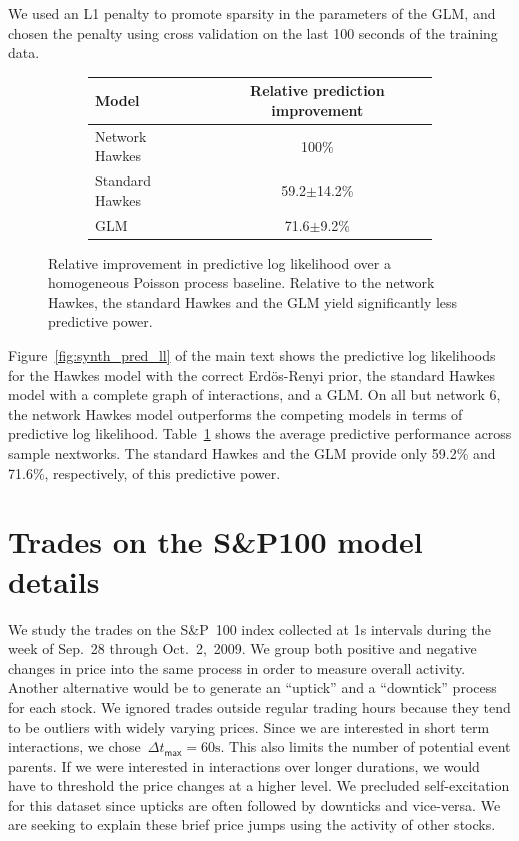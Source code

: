 We used an L1 penalty to promote sparsity in the parameters of the GLM, and chosen the penalty using cross validation on the last 100 seconds of the training data.

\begin{figure}[h!]
\begin{center}
\begin{subfigure}[T]{\linewidth}
\begin{center}
\begin{tabular}{|l|c|}
\hline
\textbf{Model} & \textbf{Relative prediction improvement} \\
\hline
Network Hawkes & 100\% \\
Standard Hawkes & 59.2$\pm$14.2\% \\
GLM & 71.6$\pm$9.2\%\\
\hline
\end{tabular}
\end{center}
\end{subfigure}
\end{center}
\caption{Relative improvement in predictive log likelihood over a homogeneous Poisson process baseline. Relative to the network Hawkes, the standard Hawkes and the GLM yield significantly less predictive power.}
\label{tab:rel_pred_ll}
\end{figure}
Figure~\ref{fig:synth_pred_ll} of the main text shows the predictive log likelihoods for the Hawkes model with the correct Erd\"os-Renyi prior, the standard Hawkes model with a complete graph of interactions, and a GLM. On all but network 6, the network Hawkes model outperforms the competing models in terms of predictive log likelihood. Table~\ref{tab:rel_pred_ll} shows the average predictive performance across sample nextworks. The standard Hawkes and the GLM provide only 59.2\% and 71.6\%, respectively, of this predictive power.

\section{Trades on the S\&P100 model details}
We study the trades on the S\&P~100 index collected at 1s intervals during the week of Sep.~28 through Oct.~2,~2009. We group both positive and negative changes in price into the same process in order to measure overall activity. Another alternative would be to generate an ``uptick'' and a ``downtick'' process for each stock.  We ignored trades outside regular trading hours because they tend to be outliers with widely varying prices. Since we are interested in short term interactions,  we chose~${\Delta t_{\mathsf{max}}=60\mathrm{s}}$. This also limits the number of potential event parents. If we were interested in interactions over longer durations, we would have to threshold the price changes at a higher level. We precluded self-excitation for this dataset since upticks are often followed by downticks and vice-versa. We are seeking to explain these brief price jumps using the activity of other stocks.

